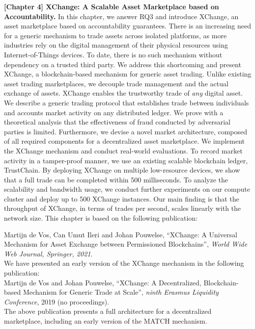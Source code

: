 \textbf{[Chapter 4] XChange: A Scalable Asset Marketplace based on Accountability.}
In this chapter, we answer RQ3 and introduce XChange, an asset marketplace based on accountability guarantees.
There is an increasing need for a generic mechanism to trade assets across isolated platforms, as more industries rely on the digital management of their physical resources using Internet-of-Things devices.
To date, there is no such mechanism without dependency on a trusted third party.
We address this shortcoming and present XChange, a blockchain-based mechanism for generic asset trading.
Unlike existing asset trading marketplaces, we decouple trade management and the actual exchange of assets.
XChange enables the trustworthy trade of \emph{any} digital asset.
We describe a generic trading protocol that establishes trade between individuals and accounts market activity on any distributed ledger.
We prove with a theoretical analysis that the effectiveness of fraud conducted by adversarial parties is limited.
Furthermore, we devise a novel market architecture, composed of all required components for a decentralized asset marketplace.
We implement the XChange mechanism and conduct real-world evaluations.
To record market activity in a tamper-proof manner, we use an existing scalable blockchain ledger, TrustChain.
By deploying XChange on multiple low-resource devices, we show that a full trade can be completed within 500 milliseconds.
To analyze the scalability and bandwidth usage, we conduct further experiments on our compute cluster and deploy up to 500 XChange instances.
Our main finding is that the throughput of XChange, in terms of trades per second, scales linearly with the network size.
This chapter is based on the following publication:

Martijn de Vos, Can Umut Ileri and Johan Pouwelse, \enquote{XChange: A Universal Mechanism for Asset Exchange between Permissioned Blockchains}, \emph{World Wide Web Journal, Springer, 2021}.\\

\noindent We have presented an early version of the XChange mechanism in the following publication:\\

Martijn de Vos and Johan Pouwelse, \enquote{XChange: A Decentralized, Blockchain-based Mechanism for Generic Trade at Scale}, \emph{ninth Erasmus Liquidity Conference}, 2019 (no proceedings).\\

The above publication presents a full architecture for a decentralized marketplace, including an early version of the MATCH mechanism.\\

